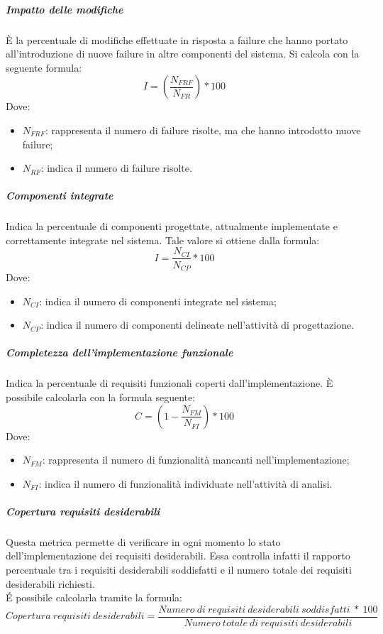 \documentclass[../NormeDiProgetto_v4.0.0.tex]{subfiles}
\begin{document}
			\subparagraph{Impatto delle modifiche}
				È la percentuale di modifiche effettuate in risposta a failure che hanno portato all'introduzione di nuove failure in altre componenti del sistema. Si calcola con la seguente formula:
					\begin{equation*}
						I = (\frac{N_{FRF}}{N_{FR}}) * 100
					\end{equation*}
					Dove:
					\begin{itemize}
						\item \textbf{$	N_{FRF}$}: rappresenta il numero di failure risolte, ma che hanno introdotto nuove failure;
						\item \textbf{$N_{RF}$}: indica il numero di failure risolte.
					\end{itemize}

	     		\subparagraph{Componenti integrate}
				Indica la percentuale di componenti progettate, attualmente implementate e correttamente integrate nel sistema.
				Tale valore si ottiene dalla formula:
				\begin{equation*}
					I = \frac{N_{CI}}{N_{CP}} * 100
				\end{equation*}
				Dove:
				\begin{itemize}
					\item \textbf{$N_{CI}$}: indica il numero di componenti integrate nel sistema;
					\item \textbf{$N_{CP}$}: indica il numero di componenti delineate nell'attività di progettazione.
				\end{itemize}
				
			\subparagraph{Completezza dell'implementazione funzionale}
				Indica la percentuale di requisiti funzionali coperti dall'implementazione.
				È possibile calcolarla con la formula seguente:
				\begin{equation*}
					C = (1 - \frac{N_{FM}}{N_{FI}}) * 100
				\end{equation*}
				Dove:
				\begin{itemize}
					\item \textbf{$N_{FM}$}: rappresenta il numero di funzionalità mancanti nell'implementazione;
					 \item \textbf{$N_{FI}$}: indica il numero di funzionalità individuate nell'attività di analisi.
				\end{itemize}
 
            
            \subparagraph{Copertura requisiti desiderabili}
				Questa metrica permette di verificare in ogni momento lo stato dell'implementazione dei requisiti desiderabili. Essa controlla infatti il rapporto percentuale tra i requisiti desiderabili soddisfatti e il numero totale dei requisiti desiderabili richiesti.\\
				É possibile calcolarla tramite la formula:
				\begin{equation*}
					Copertura \ requisiti \ desiderabili = \frac{Numero \ di \ requisiti \ desiderabili \ soddisfatti \ * \ 100}{Numero \ totale \ di \ requisiti \ desiderabili}
				\end{equation*}
\end{document}
